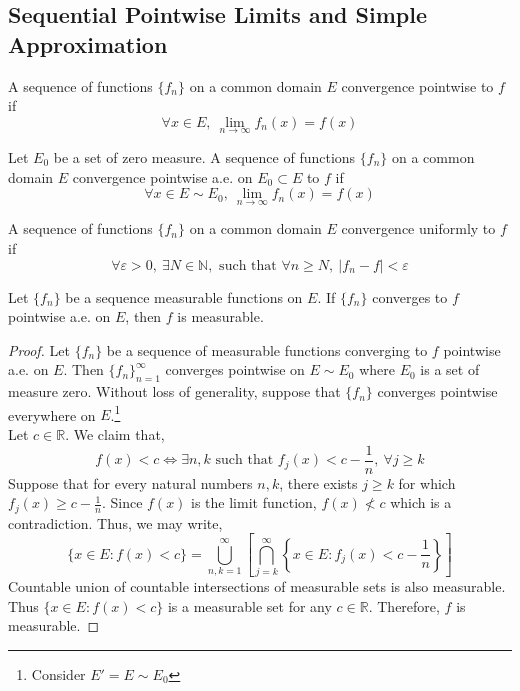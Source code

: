 \subsection{Sequential Pointwise Limits and Simple Approximation}
\begin{definition}
	A sequence of functions $\{f_n\}$ on a common domain $E$ convergence pointwise to $f$ if 
	\[ \forall x \in E,\ \lim_{n \to \infty} f_n(x) = f(x) \]
\end{definition}
\begin{definition}
	Let $E_0$ be a set of zero measure.
	A sequence of functions $\{f_n\}$ on a common domain $E$ convergence pointwise a.e. on $E_0 \subset E$ to $f$ if 
	\[ \forall x \in E \sim E_0,\ \lim_{n \to \infty} f_n(x) = f(x) \]
\end{definition}
\begin{definition}
	A sequence of functions $\{f_n\}$ on a common domain $E$ convergence uniformly to $f$ if 
	\[\forall \varepsilon > 0,\ \exists N \in \mathbb{N},\text{ such that } \forall n \ge N,\ |f_n-f| < \varepsilon \]
\end{definition}

\begin{theorem}
	Let $\{ f_n \}$ be a sequence measurable functions on $E$.
	If $\{ f_n \}$ converges to $f$ pointwise a.e. on $E$, then $f$ is measurable.
\end{theorem}
\begin{proof}
	Let $\{ f_n \}$ be a sequence of measurable functions converging to $f$ pointwise a.e. on $E$.
	Then $\{ f_n\}_{n = 1}^\infty$	converges pointwise on $E \sim E_0$ where $E_0$ is a set of measure zero.
	Without loss of generality, suppose that $\{ f_n \}$ converges pointwise everywhere on $E$.\dag\footnote{
		Consider $E' = E \sim E_0$}\\

	Let $c \in \mathbb{R}$.
	We claim that,
	\begin{equation}
		f(x) < c \iff \exists n,k \text{ such that } f_j(x) < c-\frac{1}{n},\ \forall j \ge k
	\end{equation}
	Suppose that for every natural numbers $n,k$, there exists $j \ge k$ for which $f_j(x) \ge c - \frac{1}{n}$.
	Since $f(x)$ is the limit function, $f(x) \not< c$ which is a contradiction. 
	Thus, we may write,
	\begin{equation}
		\{ x \in E : f(x) < c \} = \bigcup_{n,k = 1}^\infty \left[ \bigcap_{j=k}^\infty \left\{ x \in E : f_j(x) < c-\frac{1}{n} \right\} \right] 
	\end{equation}
	Countable union of countable intersections of measurable sets is also measurable.
	Thus $\{ x \in E : f(x) < c \}$ is a measurable set for any $c \in \mathbb{R}$.
	Therefore, $f$ is measurable.
\end{proof}

